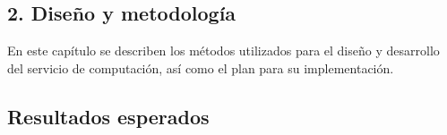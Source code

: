 \begin{doublespace}
\begin{tightcenter}
\section{2. Diseño y metodología}
\mylinespacing
\end{tightcenter}

\begin{multicols}{2}

    En este capítulo se describen los métodos utilizados para el diseño y desarrollo del servicio de computación, así como el plan para su implementación.

    \subsection{Resultados esperados}
    
\end{multicols}

\mylinespacing
\mylinespacing
\begin{tightcenter}
\end{tightcenter}
\end{doublespace}
